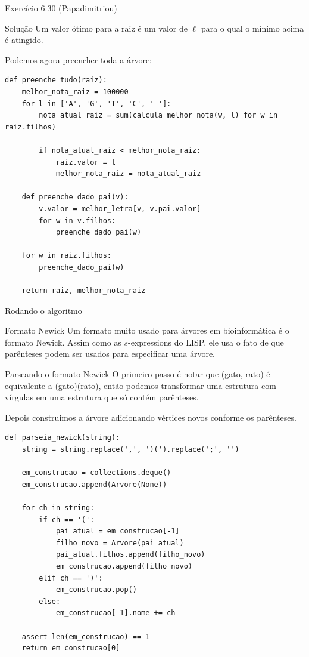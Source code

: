 \documentclass[presentation]{beamer}
\begin{document}
\begin{frame}[fragile,label=sec-4]{Exercício 6.30 (Papadimitriou)}
\begin{block}{Solução}
Um valor ótimo para a raiz é um valor de $\ell$ para o qual o mínimo
acima é atingido.


Podemos agora preencher toda a árvore:
\begin{verbatim}
def preenche_tudo(raiz):
    melhor_nota_raiz = 100000
    for l in ['A', 'G', 'T', 'C', '-']:
        nota_atual_raiz = sum(calcula_melhor_nota(w, l) for w in raiz.filhos)

        if nota_atual_raiz < melhor_nota_raiz:
            raiz.valor = l
            melhor_nota_raiz = nota_atual_raiz

    def preenche_dado_pai(v):
        v.valor = melhor_letra[v, v.pai.valor]
        for w in v.filhos:
            preenche_dado_pai(w)

    for w in raiz.filhos:
        preenche_dado_pai(w)

    return raiz, melhor_nota_raiz
\end{verbatim}
\end{block}

\begin{block}{Rodando o algoritmo}
\begin{block}{Formato Newick}
Um formato muito usado para árvores em bioinformática é o formato
Newick. Assim como as $s$-expressions do LISP, ele usa o fato de que
parênteses podem ser usados para especificar uma árvore.

\begin{block}{Parseando o formato Newick}
O primeiro passo é notar que (gato, rato) é equivalente a
(gato)(rato), então podemos transformar uma estrutura com vírgulas
em uma estrutura que só contém parênteses.

Depois construimos a árvore adicionando vértices novos conforme os
parênteses.
\begin{verbatim}
def parseia_newick(string):
    string = string.replace(',', ')(').replace(';', '')

    em_construcao = collections.deque()
    em_construcao.append(Arvore(None))

    for ch in string:
        if ch == '(':
            pai_atual = em_construcao[-1]
            filho_novo = Arvore(pai_atual)
            pai_atual.filhos.append(filho_novo)
            em_construcao.append(filho_novo)
        elif ch == ')':
            em_construcao.pop()
        else:
            em_construcao[-1].nome += ch

    assert len(em_construcao) == 1
    return em_construcao[0]
\end{verbatim}
\end{block}
\end{block}


\end{block}
\end{frame}
\end{document}
